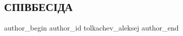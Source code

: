  
 
 
 
 
 
\subsection{СПІВБЕСІДА}
\label{sec:05_12_2021.fb.tolkachev_aleksej.1.spivbesida}
 
\ifcmt
 author_begin
   author_id tolkachev_aleksej
 author_end
\fi

